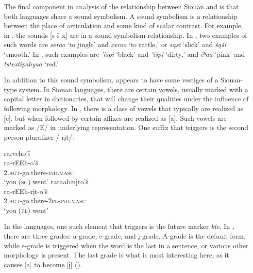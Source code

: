\documentclass[output=paper]{LSP/langsci}
\begin{document}
The final component in  analysis of the relationship between Siou\-an and  is that both languages share a  sound symbolism. A sound symbolism is a relationship between the place of articulation and some kind of scalar contrast. For example, in , the sounds [s \v{s} x] are in a sound symbolism relationship. In , two examples of such words are \emph{seroo} `to jingle' and \emph{xeroo} `to rattle,' or \emph{s\k{a}si} `slick' and \emph{\v{s}\k{a}\v{s}i} `smooth.' In , such examples are \emph{'ispi} `black' and \emph{'i\v{s}pi} `dirty,' and \emph{\v{c}ʰa\textbeltl a} `pink' and \emph{tstextipa{\super h}ya\textbeltl a} `red.'

In addition to this sound symbolism,  appears to have some vestiges of a Siouan-type  system. In Siouan languages, there are certain vowels, usually marked with a capital letter in dictionaries, that will change their qualities under the influence of following morphology. In , there is a class of vowels that typically are realized as [e], but when followed by certain affixes are realized as [a]. Such vowels are marked as /E/ in underlying representation. One suffix that triggers  is the second person pluralizer /-r\k{i}t/:

\ea
	\ea 
	\glll rareeho'\v{s} \\
	ra-rEEh-o'\v{s} \\	
	\textsc{2.agt}-go.there-\textsc{ind.masc} \\
	\glt	`you (\textsc{sg}) went'
	\ex 
	\glll raraahin\k{i}to'\v{s}\\
	ra-rEEh-r\k{i}t-o'\v{s}\\	
	\textsc{2.agt}-go.there-\textsc{2pl-ind.masc}\\
	\glt	`you (\textsc{pl}) went'
	\z
\z

In the  languages, one such element that triggers  is the future marker \emph{kte}. In , there are three  grades: a-grade, e-grade, and \k{i}-grade. A-grade is the default form, while e-grade is triggered when the word is the last in a sentence, or various other morphology is present. The last grade is what is most interesting here, as it causes [a] to become [\k{i}] (\citealt{Ullrich2008}).
\end{document}

